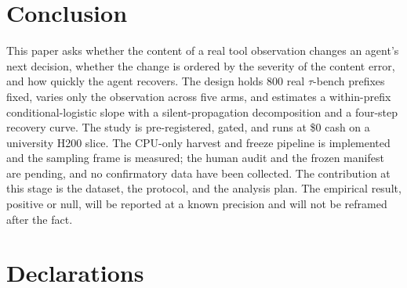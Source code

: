 \documentclass[a4paper,fleqn]{cas-sc}
\begin{document}
\section{Conclusion}\label{sec:conclusion}

This paper asks whether the content of a real tool observation changes an agent's next decision,
whether the change is ordered by the severity of the content error, and how quickly the agent
recovers. The design holds 800 real $\tau$-bench prefixes fixed, varies only the observation across
five arms, and estimates a within-prefix conditional-logistic slope with a silent-propagation
decomposition and a four-step recovery curve. The study is pre-registered, gated, and runs at \$0
cash on a university H200 slice. The CPU-only harvest and freeze pipeline is implemented and the
sampling frame is measured; the human audit and the frozen manifest are pending, and no
confirmatory data have been collected. The contribution at this stage is the dataset, the
protocol, and the analysis plan. The empirical result, positive or null, will be reported at a
known precision and will not be reframed after the fact. \printcredits \section*{Declarations}
\end{document}
